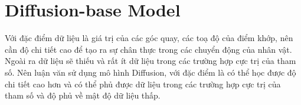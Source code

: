
\section{Diffusion-base Model}
\label{sec:diffusionbase}



Với đặc điểm dữ liệu là giá trị của các góc quay, các toạ độ của điểm khớp, nên cần độ chi tiết cao để tạo ra sự chân thực trong các chuyển động của nhân vật. Ngoài ra dữ liệu sẽ thiếu và rất ít dữ liệu trong các trường hợp cực trị của tham số.
Nên luận văn sử dụng mô hình Diffusion, với đặc điểm là có thể học được độ chi tiết cao hơn và có thể phủ được dữ liệu trong các trường hợp cực trị của tham số và độ phủ về mật độ dữ liệu thấp.


